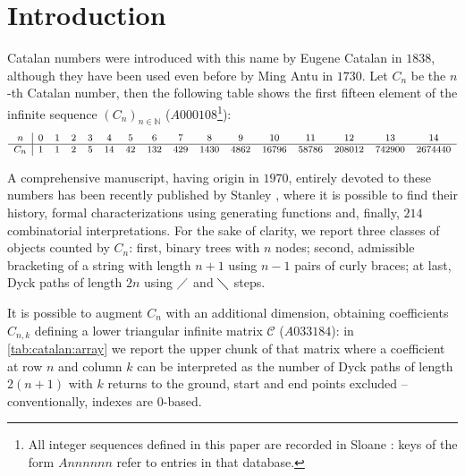
\section{Introduction}

\noindent Catalan numbers were introduced with this name by
Eugene Catalan in $1838$, although they have been used even before by Ming Antu
in $1730$. Let $C_{n}$ be the $n$-th Catalan number, then the following
table shows the first fifteen element of the infinite sequence 
$\left(C_{n}\right)_{n\in\mathbb{N}}$ ($A000108$\footnote{All integer sequences
defined in this paper are recorded in Sloane \cite{sloane:oeis}: keys of
the form $Annnnnn$ refer to entries in that database.}):
\begin{displaymath}
    \footnotesize
    \begin{array}{c|ccccccccccccccc}
        n & 0 & 1 & 2 & 3 & 4 & 5 & 6 & 7 & 8 & 9 & 10 & 11 & 12 & 13 & 14 \\
        \hline
        C_{n} & 1 & 1 & 2 & 5 & 14 & 42 & 132 & 429 & 1430 & 4862 & 16796 & 58786 & 208012 & 742900 & 2674440
    \end{array}
\end{displaymath}

A comprehensive manuscript, having origin in $1970$, entirely devoted to these numbers has been recently
published by Stanley \cite{stanley:2015}, where it is possible to find their history,
formal characterizations using generating functions and, finally, $214$ combinatorial 
interpretations.  For the sake of clarity, we report three classes of objects counted by 
$C_{n}$: first, binary trees with $n$ nodes; 
second, admissible bracketing of a string with length $n+1$ using $n-1$ pairs
of curly braces; at last, Dyck paths of length $2n$ using $\diagup$ and $\diagdown$ steps.

It is possible to augment $C_{n}$ with an additional dimension,
obtaining coefficients $C_{n,k}$ defining a lower triangular infinite 
matrix $\mathcal{C}$ ($A033184$): in \autoref{tab:catalan:array} 
we report the upper chunk of that matrix where a coefficient at row $n$ 
and column $k$ can be interpreted as the number
of Dyck paths of length $2(n+1)$ with $k$ returns to the ground, start
and end points excluded -- conventionally, indexes are $0$-based.



